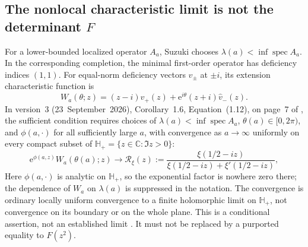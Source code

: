 \documentclass[11pt,letterpaper]{article}
\numberwithin{equation}{section}
\theoremstyle{definition}
\theoremstyle{remark}
\newcommand{\C}{\mathbb C}
\newcommand{\e}{\mathrm e}
\begin{document}
\subsection{The nonlocal characteristic limit is not the determinant \texorpdfstring{$F$}{F}}
\label{subsec:weillimitratio}
For a lower-bounded localized operator $A_a$, Suzuki chooses $\lambda(a)<\inf\operatorname{spec}A_a$. In the corresponding completion, the minimal first-order operator has deficiency indices $(1,1)$. For equal-norm deficiency vectors $v_\pm$ at $\pm i$, its extension characteristic function is \cite[Equation~(1.11)]{suzuki2026}
\begin{equation}
 W_a(\theta;z)=(z-i)\widehat v_+(z)+\e^{i\theta}(z+i)\widehat v_-(z).
 \label{eq:nonlocal_characteristic}
\end{equation}
In version~3 (23~September~2026), Corollary~1.6, Equation~(1.12), on page~7 of \cite{suzuki2026}, the sufficient condition requires choices of $\lambda(a)<\inf\operatorname{spec}A_a$, $\theta(a)\in[0,2\pi)$, and $\phi(a,\cdot)$ for all sufficiently large $a$, with convergence as $a\to\infty$ uniformly on every compact subset of $\mathbb H_+=\{z\in\C:\Im z>0\}$:
\begin{equation}
 \e^{\phi(a,z)}W_a(\theta(a);z)\longrightarrow
 \mathcal R_\xi(z):=
 \frac{\xi(1/2-iz)}{\xi(1/2-iz)+\xi'(1/2-iz)},
 \label{eq:nonlocal_target}
\end{equation}
Here $\phi(a,\cdot)$ is analytic on $\mathbb H_+$, so the exponential factor is nowhere zero there; the dependence of $W_a$ on $\lambda(a)$ is suppressed in the notation. The convergence is ordinary locally uniform convergence to a finite holomorphic limit on $\mathbb H_+$, not convergence on its boundary or on the whole plane. This is a conditional assertion, not an established limit \cite[Corollary~1.6, Equation~(1.12)]{suzuki2026}. It must not be replaced by a purported equality to $F(z^2)$.
\end{document}
